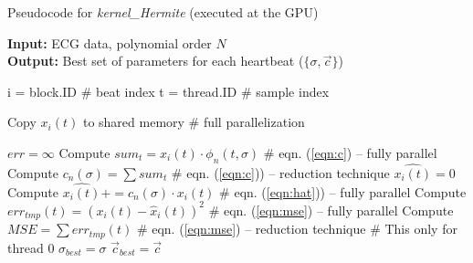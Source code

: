 \documentclass[runningheads]{llncs}
\begin{document}
\begin{algorithm}[h]
\caption{Pseudocode for \textit{kernel\_Hermite} (executed at the GPU)} 
\label{alg:hermite} 
\textbf{Input:} ECG data, polynomial order $N$ \\
\textbf{Output:} Best set of parameters for each heartbeat ($\{\sigma, \vec{c}\}$) \\
        
\begin{algorithmic}[1]
	\STATE i = block.ID \hspace{30 pt} \# beat index \label{alg:hermite_id1}
	\STATE t = thread.ID\hspace{30 pt} \# sample index \label{alg:hermite_id2}
	
	\vspace{3 pt}
	\STATE Copy $x_i(t)$ to shared memory \# full parallelization \label{alg:hermite_copy}
	
	\vspace{3 pt}
	\STATE $err=\infty$ \label{alg:hermite_mse1}
	\FORALL {$\sigma$} \label{alg:hermite_sigmab}
		 \label{alg:hermite_c1b}
			\STATE Compute $sum_t=x_i(t)\cdot \phi_n(t,\sigma)$ \# eqn. (\ref{eqn:c}) -- fully parallel
		\ENDFOR \label{alg:hermite_c1e}
\vspace{3 pt}
		 \label{alg:hermite_c2b}
			\STATE Compute $c_n(\sigma)=\sum{sum_t}$ \# eqn. (\ref{eqn:c})) -- reduction technique \cite{b:kirk10} 
		\ENDFOR \label{alg:hermite_c2e}
\vspace{3 pt}
		$\hat{x_i(t)} = 0$ \label{alg:hermite_hatb}
			\STATE Compute $\hat{x_i(t)} += c_n(\sigma)\cdot x_i(t)$ \# eqn. (\ref{eqn:hat})) -- fully parallel
		\ENDFOR \label{alg:hermite_hate}
\vspace{3 pt}		
		\STATE Compute $err_{tmp}(t)=\left( x_i(t) - \hat{x}_i(t)\right)^2$ \# eqn. (\ref{eqn:mse}) -- fully parallel \label{alg:hermite_mseb}
		\STATE Compute $MSE=\sum{err_{tmp}(t)}$	\# eqn. (\ref{eqn:mse}) -- reduction technique 	\label{alg:hermite_msee}
\vspace{3 pt}		\STATE \# This only for thread $0$
		 \label{alg:hermite_bestb} 
			\STATE $\sigma_{best}=\sigma$
			\STATE $\vec{c}_{best}=\vec{c}$
		\ENDIF \label{alg:hermite_beste}		
	\ENDFOR \label{alg:hermite_sigmae}		
\end{algorithmic}
\end{algorithm} 
\end{document}
